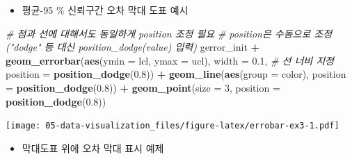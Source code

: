 \documentclass[
  11pt,
]{krantz}
\newenvironment{Shaded}{\begin{snugshade}}{\end{snugshade}}
\newcommand{\CommentTok}[1]{\textcolor[rgb]{0.37,0.37,0.37}{\textit{#1}}}
\newcommand{\DataTypeTok}[1]{\textcolor[rgb]{0.27,0.27,0.27}{#1}}
\newcommand{\DecValTok}[1]{\textcolor[rgb]{0.06,0.06,0.06}{#1}}
\newcommand{\FloatTok}[1]{\textcolor[rgb]{0.06,0.06,0.06}{#1}}
\newcommand{\KeywordTok}[1]{\textcolor[rgb]{0.27,0.27,0.27}{\textbf{#1}}}
\newcommand{\NormalTok}[1]{#1}
\newcommand{\OperatorTok}[1]{\textcolor[rgb]{0.43,0.43,0.43}{\textbf{#1}}}
\newcommand{\StringTok}[1]{\textcolor[rgb]{0.5,0.5,0.5}{#1}}
\providecommand{\tightlist}{%
  \setlength{\itemsep}{0pt}\setlength{\parskip}{0pt}}
\begin{document}
\begin{itemize}
\tightlist
\item
  평균-95 \% 신뢰구간 오차 막대 도표 예시
\end{itemize}

\footnotesize

\begin{Shaded}
\begin{Highlighting}[]
\CommentTok{# 점과 선에 대해서도 동일하게 position 조정 필요}
\CommentTok{# position은 수동으로 조정("dodge" 등 대신 position_dodge(value) 입력)}
\NormalTok{gerror_init }\OperatorTok{+}\StringTok{ }
\StringTok{  }\KeywordTok{geom_errorbar}\NormalTok{(}\KeywordTok{aes}\NormalTok{(}\DataTypeTok{ymin =}\NormalTok{ lcl, }
                    \DataTypeTok{ymax =}\NormalTok{ ucl), }
                \DataTypeTok{width =} \FloatTok{0.1}\NormalTok{,  }\CommentTok{# 선 너비 지정}
                \DataTypeTok{position =} \KeywordTok{position_dodge}\NormalTok{(}\FloatTok{0.8}\NormalTok{)) }\OperatorTok{+}\StringTok{ }
\StringTok{  }\KeywordTok{geom_line}\NormalTok{(}\KeywordTok{aes}\NormalTok{(}\DataTypeTok{group =}\NormalTok{ color), }
            \DataTypeTok{position =} \KeywordTok{position_dodge}\NormalTok{(}\FloatTok{0.8}\NormalTok{)) }\OperatorTok{+}\StringTok{ }
\StringTok{  }\KeywordTok{geom_point}\NormalTok{(}\DataTypeTok{size =} \DecValTok{3}\NormalTok{, }
             \DataTypeTok{position =} \KeywordTok{position_dodge}\NormalTok{(}\FloatTok{0.8}\NormalTok{))}
\end{Highlighting}
\end{Shaded}

\texttt{[image: 05-data-visualization\_files/figure-latex/errobar-ex3-1.pdf]}

\normalsize

\begin{itemize}
\tightlist
\item
  막대도표 위에 오차 막대 표시 예제
\end{itemize}

\footnotesize

\begin{Shaded}
\end{Shaded}
\end{document}
